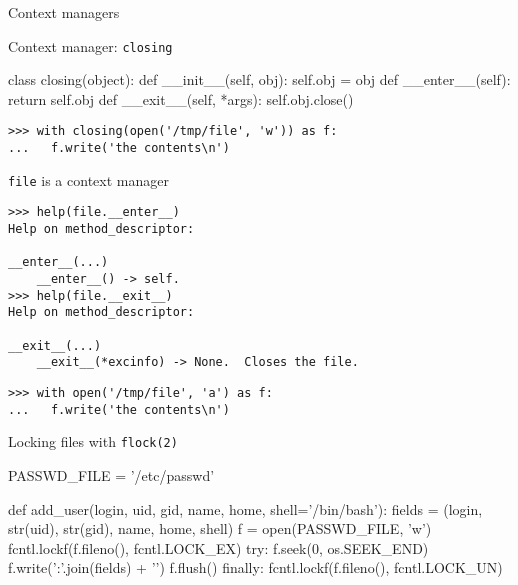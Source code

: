 \documentclass{beamer}
\begin{document}
\begin{frame}{}
  \center\Huge Context managers
\end{frame}


\begin{frame}[fragile]{Context manager: \texttt{closing}}
  \begin{pycode}
     class closing(object):
         def __init__(self, obj):
             self.obj = obj
         def __enter__(self):
             return self.obj
         def __exit__(self, *args):
             self.obj.close()
  \end{pycode}
  \pause
  \begin{verbatim}
>>> with closing(open('/tmp/file', 'w')) as f:
...   f.write('the contents\n')
  \end{verbatim}
\end{frame}

\begin{frame}[fragile]{\texttt{file} is a context manager}
  \begin{verbatim}
>>> help(file.__enter__)
Help on method_descriptor:

__enter__(...)
    __enter__() -> self.
>>> help(file.__exit__)
Help on method_descriptor:

__exit__(...)
    __exit__(*excinfo) -> None.  Closes the file.
  \end{verbatim}
  \pause
  \begin{verbatim}
>>> with open('/tmp/file', 'a') as f:
...   f.write('the contents\n')
  \end{verbatim}
\end{frame}

\begin{frame}[fragile]{Locking files with \texttt{flock(2)}}
  \begin{pycode}
    PASSWD_FILE = '/etc/passwd'

    def add_user(login, uid, gid, name, home,
                 shell='/bin/bash'):
        fields = (login, str(uid), str(gid),
                  name, home, shell)
        f = open(PASSWD_FILE, 'w')
        fcntl.lockf(f.fileno(), fcntl.LOCK_EX)
        try:
            f.seek(0, os.SEEK_END)
            f.write(':'.join(fields) + '\n')
            f.flush()
        finally:
            fcntl.lockf(f.fileno(), fcntl.LOCK_UN)
  \end{pycode}
\end{frame}
\end{document}
